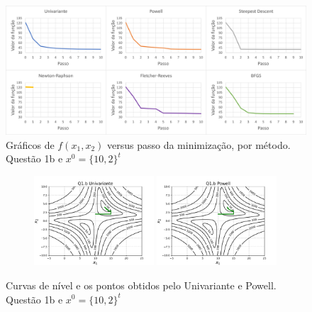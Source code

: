 \documentclass[10pt, a4paper]{article}
\begin{document}
\begin{figure}[H]
  \centering
  \includegraphics[scale=0.4]{figuras/q1b_fxpassos_P1.PNG}
  \caption{Gráficos de $f(x_1,x_2)$ versus passo da minimização, por método. Questão 1b e $x^0 = \{10,2\}^t$}
\end{figure}

\begin{figure}[H]
  \centering
  \begin{subfigure}[b]{\textwidth}
    \includegraphics[width=0.49\textwidth]{figuras/Q1.b_Univariante_P0=[10e2].pdf}
    \includegraphics[width=0.49\textwidth]{figuras/Q1.b_Powell_P0=[10e2].pdf}
  \end{subfigure}
  \caption{Curvas de nível e os pontos obtidos pelo Univariante e Powell. Questão 1b e $x^0 = \{10,2\}^t$}
\end{figure}
\end{document}
